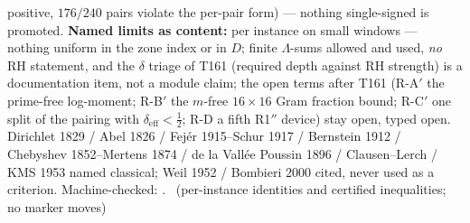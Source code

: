 \documentclass[11pt,a4paper]{article}
\theoremstyle{definition}
\begin{document}
positive, $176/240$ pairs violate the per-pair form) --- nothing
single-signed is promoted.
\textbf{Named limits as content:} per instance on small windows ---
nothing uniform in the zone index or in $D$; finite $\Lambda$-sums
allowed and used, \emph{no} RH statement, and the $\delta$ triage of
T161 (required depth against RH strength) is a documentation item, not a
module claim; the open terms after T161 (R-A$'$ the prime-free
log-moment; R-B$'$ the $m$-free $16\times16$ Gram fraction bound; R-C$'$
one split of the pairing with $\delta_{\mathrm{eff}}<\tfrac12$; R-D a
fifth R1$''$ device) stay open, typed open.
Dirichlet 1829 / Abel 1826 / Fej\'er 1915--Schur 1917 / Bernstein 1912 /
Chebyshev 1852--Mertens 1874 / de la Vall\'ee Poussin 1896 /
Clausen--Lerch / KMS 1953 named classical; Weil 1952 / Bombieri 2000
cited, never used as a criterion.
Machine-checked:
.
\mE\ (per-instance identities and certified inequalities; no marker moves)
\end{document}
